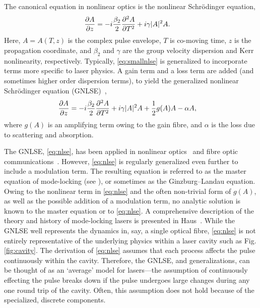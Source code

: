 \documentclass[9pt,twocolumn,twoside]{osajnl}
\newcommand{\pdiff}[3][\hspace{-0.5pt}]{\frac{\partial^{#1}#2}{\partial{#3}^{#1}}} %
\begin{document}
The canonical equation in nonlinear optics is the nonlinear Schr\"odinger equation,
\begin{align}
	\pdiff{A}{z} &= - i \frac{\beta_2}{2}\pdiff[2]{A}{T} + i \gamma |A|^2 A.
	\label{eq:smallnlse}
\end{align}
Here, $A = A(T, z)$ is the complex pulse envelope, $T$ is co-moving time, $z$ is the propagation coordinate, and $\beta_2$ and $\gamma$ are the group velocity dispersion and Kerr nonlinearity, respectively. Typically, \eqref{eq:smallnlse} is generalized to incorporate terms more specific to laser physics. A gain term and a loss term are added (and sometimes higher order dispersion terms), to yield the generalized nonlinear Schr\"odinger equation (GNLSE)~\cite{agrawal2013, bohun2015, finot2008, peng2018, shtyrina2017, yarutkina2013},
	\begin{align}
	\pdiff{A}{z} &= - i \frac{\beta_2}{2}\pdiff[2]{A}{T} + i \gamma |A|^2 A + \frac{1}{2}g(A) A - \alpha A,
	\label{eq:nlse}
\end{align}
where $g(A)$ is an amplifying term owing to the gain fibre, and $\alpha$ is the loss due to scattering and absorption.

The GNLSE, \eqref{eq:nlse}, has been applied in nonlinear optics~\cite{agrawal2013} and fibre optic communications~\cite{agrawal2002}. However, \eqref{eq:nlse} is regularly generalized even further to include a modulation term. The resulting equation is referred to as the master equation of mode-locking (see \cite{haus1975, haus1984, haus2000, tamura1996, usechak2005}), or sometimes as the Ginzburg--Landau equation. Owing to the nonlinear term in \eqref{eq:nlse} and the often non-trivial form of $g(A)$, as well as the possible addition of a modulation term, no analytic solution is known to the master equation or to \eqref{eq:nlse}. A comprehensive description of the theory and history of mode-locking lasers is presented in Haus~\cite{haus2000}. While the GNLSE well represents the dynamics in, say, a single optical fibre, \eqref{eq:nlse} is not entirely representative of the underlying physics within a laser cavity such as Fig. \ref{fig:cavity}. The derivation of \eqref{eq:nlse} assumes that each process affects the pulse continuously within the cavity. Therefore, the GNLSE, and generalizations, can be thought of as an `average' model for lasers---the assumption of continuously effecting the pulse breaks down if the pulse undergoes large changes during any one round trip of the cavity. Often, this assumption does not hold because of the specialized, discrete components.
\end{document}
